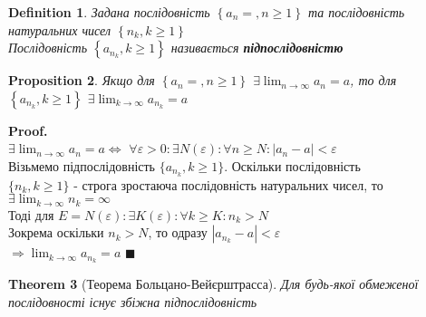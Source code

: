 \documentclass[a4paper, 14pt]{extarticle}
\def\huge{\displaystyle}
\newcommand{\sequence}[2][{}]{%
\ifthenelse{\equal{#1}{}}{$\{{#2}, n \geq 1 \}$}
{$\huge \left\{ {#2} = {#1}, n \geq 1 \right\}$}%
}
\theoremstyle{theoremdd}
\newtheorem{theorem}{Theorem}[subsection]
\theoremstyle{theoremdd}
\newtheorem{definition}[theorem]{Definition}
\theoremstyle{theoremdd}
\theoremstyle{theoremdd}
\theoremstyle{theoremdd}
\newtheorem{proposition}[theorem]{Proposition}
\theoremstyle{theoremdd}
\theoremstyle{theoremdd}
\theoremstyle{theoremdd}
\newenvironment{pf}{\vspace*{-3mm} \textbf{Proof. \\}}{$\blacksquare$}
\def\subsequence#1{$\displaystyle \left\{ {#1}, k\geq1 \right\}$}
\def\limitdef#1#2#3#4#5{$\displaystyle \forall #1 > 0: \exists #2(#1): \forall #3 \geq #2: \left|#4 - #5\right| < #1$}
\begin{document}
	\begin{definition}
	Задана послідовність \sequence{a_n} та послідовність натуральних чисел \subsequence{n_k}\\
	Послідовність \subsequence{a_{n_k}} називається \textbf{підпослідовністю}
	\end{definition}
	
	\begin{proposition}
	Якщо для \sequence{a_n} $\displaystyle \exists \lim_{n \to \infty} a_n = a $, то для \subsequence{a_{n_k}} $\exists \huge \lim_{k \to \infty} a_{n_k} = a$
	\end{proposition}
	
	\begin{pf}
	$\displaystyle \exists \lim_{n \to \infty} a_n = a \iff$ \limitdef{\varepsilon}{N}{n}{a_n}{a}\\
	Візьмемо підпослідовність $\{a_{n_k}, k \geq 1\}$. Оскільки послідовність \\ $\{n_k, k \geq 1\}$ - строга зростаюча послідовність натуральних чисел, то $\exists \huge \lim_{k \to \infty} n_k = \infty$\\
	Тоді для $E = N(\varepsilon): \exists K(\varepsilon): \forall k \geq K: n_k > N$\\
	Зокрема оскільки $n_k > N$, то одразу $|a_{n_k} - a| < \varepsilon$\\
	$\Rightarrow \displaystyle \lim_{k \to \infty} a_{n_k} = a$
	\end{pf}
	
	\begin{theorem}[Теорема Больцано-Вейєрштрасса]
	Для будь-якої обмеженої послідовності існує збіжна підпослідовність
	\end{theorem}
	
\end{document}
